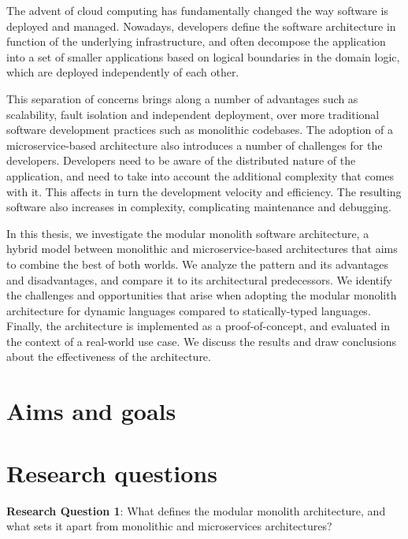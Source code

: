 \documentclass[12pt]{article}
\begin{document}
	The advent of cloud computing has fundamentally changed the way software is deployed and managed.
	Nowadays, developers define the software architecture in function of the underlying infrastructure, and often decompose the application into a set of smaller applications based on logical boundaries in the domain logic, which are deployed independently of each other.

	This separation of concerns brings along a number of advantages such as scalability, fault isolation and independent deployment, over more traditional software development practices such as monolithic codebases.
	The adoption of a microservice-based architecture also introduces a number of challenges for the developers.
	Developers need to be aware of the distributed nature of the application, and need to take into account the additional complexity that comes with it.
	This affects in turn the development velocity and efficiency.
	The resulting software also increases in complexity, complicating maintenance and debugging.

	In this thesis, we investigate the modular monolith software architecture, a hybrid model between monolithic and microservice-based architectures that aims to combine the best of both worlds.
	We analyze the pattern and its advantages and disadvantages, and compare it to its architectural predecessors.
	We identify the challenges and opportunities that arise when adopting the modular monolith architecture for dynamic languages compared to statically-typed languages.
	Finally, the architecture is implemented as a proof-of-concept, and evaluated in the context of a real-world use case.
	We discuss the results and draw conclusions about the effectiveness of the architecture.

	\clearpage

	\section{Aims and goals}\label{sec:aims-and-goals}

	\clearpage

	\section{Research questions}\label{sec:research-questions}

	\textbf{Research Question 1}: What defines the modular monolith architecture, and what sets it apart from monolithic and microservices architectures?
\end{document}
